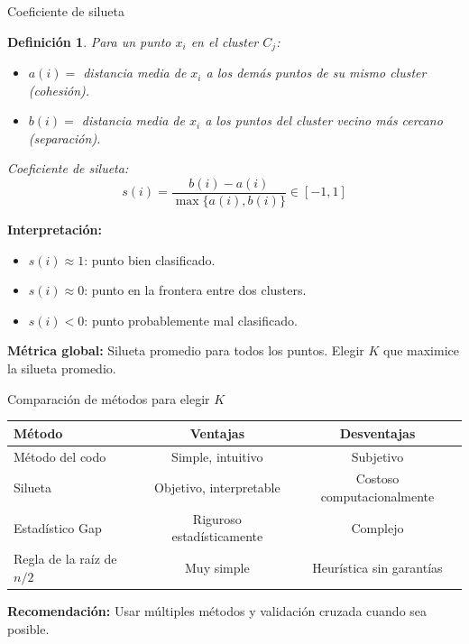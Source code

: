 \documentclass[aspectratio=169]{beamer}
\newtheorem{definicion}{Definición}
\begin{document}
\begin{frame}{Coeficiente de silueta}
    \begin{definicion}
        Para un punto \(x_i\) en el cluster \(C_j\):
        \begin{itemize}
            \item \(a(i) =\) distancia media de \(x_i\) a los demás puntos de su mismo cluster (cohesión).
            \item \(b(i) =\) distancia media de \(x_i\) a los puntos del cluster vecino más cercano (separación).
        \end{itemize}
        Coeficiente de silueta:
        \[
        s(i) = \frac{b(i) - a(i)}{\max\{a(i), b(i)\}} \in [-1, 1]
        \]
    \end{definicion}
    
    \textbf{Interpretación:}
    \begin{itemize}
        \item \(s(i) \approx 1\): punto bien clasificado.
        \item \(s(i) \approx 0\): punto en la frontera entre dos clusters.
        \item \(s(i) < 0\): punto probablemente mal clasificado.
    \end{itemize}
    
    \textbf{Métrica global:} Silueta promedio para todos los puntos. Elegir \(K\) que maximice la silueta promedio.
\end{frame}

\begin{frame}{Comparación de métodos para elegir \(K\)}
    \begin{table}
        \centering
        \begin{tabular}{|l|c|c|}
            \hline
            \textbf{Método} & \textbf{Ventajas} & \textbf{Desventajas} \\
            \hline
            Método del codo & Simple, intuitivo & Subjetivo \\
            Silueta & Objetivo, interpretable & Costoso computacionalmente \\
            Estadístico Gap & Riguroso estadísticamente & Complejo \\
            Regla de la raíz de \(n/2\) & Muy simple & Heurística sin garantías \\
            \hline
        \end{tabular}
    \end{table}
    
    \textbf{Recomendación:} Usar múltiples métodos y validación cruzada cuando sea posible.
\end{frame}
\end{document}
